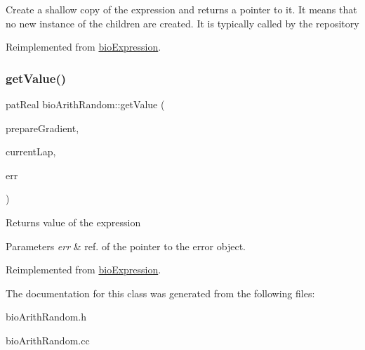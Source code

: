 Create a shallow copy of the expression and returns a pointer to it. It means that no new instance of the children are created. It is typically called by the repository 

Reimplemented from \hyperlink{classbio_expression_a442534762693b92baaf33928979a1bf8}{bio\+Expression}.

\mbox{\label{classbio_arith_random_a57ed5e619ea85ce7a4ece51ce4e05983}} 
\subsubsection{\texorpdfstring{get\+Value()}{getValue()}}
{\footnotesize\ttfamily pat\+Real bio\+Arith\+Random\+::get\+Value (\begin{DoxyParamCaption}\item[{pat\+Boolean}]{prepare\+Gradient,  }\item[{pat\+U\+Long}]{current\+Lap,  }\item[{pat\+Error $\ast$\&}]{err }\end{DoxyParamCaption})\hspace{0.3cm}{\ttfamily [virtual]}}

\begin{DoxyReturn}{Returns}
value of the expression 
\end{DoxyReturn}

\begin{DoxyParams}{Parameters}
{\em err} & ref. of the pointer to the error object. \\
\hline
\end{DoxyParams}


Reimplemented from \hyperlink{classbio_expression_af58662a5d4d456f15bc4f2c9bd4f8a5b}{bio\+Expression}.



The documentation for this class was generated from the following files\+:\begin{DoxyCompactItemize}
\item 
bio\+Arith\+Random.\+h\item 
bio\+Arith\+Random.\+cc\end{DoxyCompactItemize}
